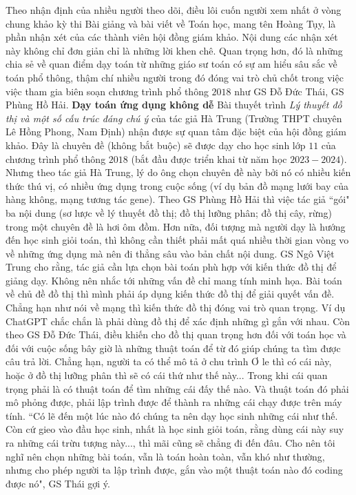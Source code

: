 \begin{multicols}{2}
	Theo nhận định của nhiều người theo dõi, điều lôi cuốn người xem nhất ở vòng chung khảo kỳ thi Bài giảng và bài viết về Toán học, mang tên Hoàng Tụy, là phần nhận xét của các thành viên hội đồng giám khảo. Nội dung các nhận xét này không chỉ đơn giản chỉ là những lời khen chê. Quan trọng hơn, đó là những chia sẻ về quan điểm dạy toán từ những giáo sư toán có sự am hiểu sâu sắc về toán phổ thông, thậm chí nhiều người trong đó đóng vai trò chủ chốt trong việc việc tham gia biên soạn chương trình phổ thông $2018$ như GS Đỗ Đức Thái, GS Phùng Hồ Hải. 
	\vskip 0.1cm
	\textbf{\color{diendantoanhoc}Dạy toán ứng dụng không dễ}
	\vskip 0.1cm
	Bài thuyết trình \textit{Lý thuyết đồ thị và một số cấu trúc đáng chú ý} của tác giả Hà Trung (Trường THPT chuyên Lê Hồng Phong, Nam Định) nhận được sự quan tâm đặc biệt của hội đồng giám khảo. Đây là chuyên đề (không bắt buộc) sẽ được dạy cho học sinh lớp $11$ của chương trình phổ thông $2018$ (bắt đầu được triển khai từ năm học $2023-2024$). Nhưng theo tác giả Hà Trung, lý do ông chọn chuyên đề này bởi nó có nhiều kiến thức thú vị, có nhiều ứng dụng trong cuộc sống (ví dụ bản đồ mạng lưới bay của hàng không, mạng tương tác gene). 
	\vskip 0.1cm
	Theo GS Phùng Hồ Hải thì việc tác giả ``gói" ba nội dung (sơ lược về lý thuyết đồ thị; đồ thị lưỡng phân; đồ thị cây, rừng) trong một chuyên đề là hơi ôm đồm. Hơn nữa, đối tượng mà người dạy là hướng đến học sinh giỏi toán, thì không cần thiết phải mất quá nhiều thời gian vòng vo về những ứng dụng mà nên đi thẳng sâu vào bản chất nội dung. 
	\vskip 0.1cm
	GS Ngô Việt Trung cho rằng, tác giả cần lựa chọn bài toán phù hợp với kiến thức đồ thị để giảng dạy. Không nên nhắc tới những vấn đề chỉ mang tính minh họa. Bài toán về chủ đề đồ thị thì mình phải áp dụng kiến thức đồ thị để giải quyết vấn đề. Chẳng hạn như nói về mạng thì kiến thức đồ thị đóng vai trò quan trọng. Ví dụ ChatGPT chắc chắn là phải dùng đồ thị để xác định những gì gắn với nhau. 
	\vskip 0.1cm
	Còn theo GS Đỗ Đức Thái, điều khiến cho đồ thị quan trọng hơn đối với toán học và đối với cuộc sống bây giờ là những thuật toán để từ đó giúp chúng ta tìm được câu trả lời. Chẳng hạn, người ta có thể mô tả  ở chu trình Ơ le thì có cái này, hoặc ở đồ thị lưỡng phân thì sẽ có cái thứ như thế này... Trong khi cái quan trọng phải là có thuật toán để tìm những cái đấy thế nào. Và thuật toán đó phải mô phỏng được, phải lập trình được để thành ra những cái chạy được trên máy tính. ``Có lẽ đến một lúc nào đó chúng ta nên dạy học sinh những cái như thế. Còn cứ gieo vào đầu học sinh, nhất là học sinh giỏi toán, rằng dùng cái này suy ra những cái trừu tượng này..., thì mãi cũng sẽ chẳng đi đến đâu. Cho nên tôi nghĩ nên chọn những bài toán, vẫn là toán hoàn toàn, vẫn khó như thường, nhưng cho phép người ta lập trình được, gắn vào một thuật toán nào đó coding được nó", GS Thái gợi ý. 

\end{multicols}
